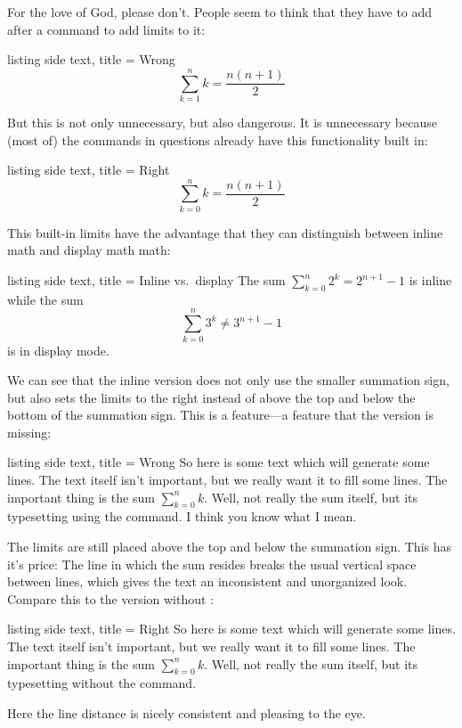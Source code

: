 \documentclass[a4paper, 10pt, headings=standardclasses, oneside, bibliography=totocnumbered]{scrbook}
\begin{document}
For the love of God, please don’t.
People seem to think that they have to add  after a command to add limits to it:
\begin{tcblisting}{listing side text, title = {Wrong}}
\[
  \sum\limits_{k=1}^n k
  =
  \frac{n(n+1)}{2}
\]
\end{tcblisting}
But this is not only unnecessary, but also dangerous.
It is unnecessary because (most of) the commands in questions already have this functionality built in:
\begin{tcblisting}{listing side text, title = {Right}}
\[
  \sum_{k=0}^n k
  =
  \frac{n(n+1)}{2}
\]
\end{tcblisting}
This built-in limits have the advantage that they can distinguish between inline math and display math math:
\begin{tcblisting}{listing side text, title = {Inline vs.\ display}}
The sum $\sum_{k=0}^n 2^k = 2^{n+1} - 1$ is inline while the sum
\[
  \sum_{k=0}^n 3^k
  \neq
  3^{n+1} - 1
\]
is in display mode.
\end{tcblisting}
We can see that the inline version does not only use the smaller summation sign, but also sets the limits to the right instead of above the top and below the bottom of the summation sign.
This is a feature---a feature that the  version is missing:
\begin{tcblisting}{listing side text, title = {Wrong}}
So here is some text which will generate some lines.
The text itself isn’t important, but we really want it to fill some lines.
The important thing is the sum $\sum\limits_{k=0}^n k$.
Well, not really the sum itself, but its typesetting using the  command.
I think you know what I mean.
\end{tcblisting}
The limits are still placed above the top and below the summation sign.
This has it’s price:
The line in which the sum resides breaks the usual vertical space between lines, which gives the text an inconsistent and unorganized look.
Compare this to the version without :
\begin{tcblisting}{listing side text, title = {Right}}
So here is some text which will generate some lines.
The text itself isn’t important, but we really want it to fill some lines.
The important thing is the sum $\sum_{k=0}^n k$.
Well, not really the sum itself, but its typesetting without the  command.
\end{tcblisting}
Here the line distance is nicely consistent and pleasing to the eye.
\end{document}
